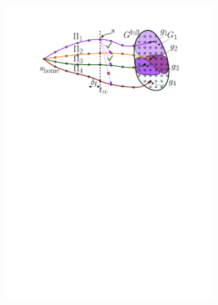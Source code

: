 \documentclass[conference]{IEEEtran}
\begin{document}
\begin{figure}[t]
    \centering
    \begin{subfigure}{.225\textwidth}
        \includegraphics[width=\textwidth]{Latching_1}
        \caption{}
        \label{fig:pl1}
    \end{subfigure}
    \begin{subfigure}{0.225\textwidth}

\end{subfigure}
\end{figure}
\end{document}
